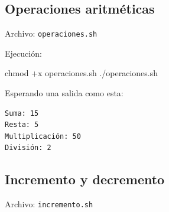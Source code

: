 \documentclass[
  spanish,
  12pt,
  letterpaper,
  DIV=11,
  numbers=noendperiod]{scrreprt}
\newenvironment{Shaded}{\begin{snugshade}}{\end{snugshade}}
\newcommand{\BuiltInTok}[1]{\textcolor[rgb]{0.00,0.23,0.31}{#1}}
\newcommand{\CommentTok}[1]{\textcolor[rgb]{0.37,0.37,0.37}{#1}}
\newcommand{\ExtensionTok}[1]{\textcolor[rgb]{0.00,0.23,0.31}{#1}}
\newcommand{\FunctionTok}[1]{\textcolor[rgb]{0.28,0.35,0.67}{#1}}
\newcommand{\NormalTok}[1]{\textcolor[rgb]{0.00,0.23,0.31}{#1}}
\newcommand{\OperatorTok}[1]{\textcolor[rgb]{0.37,0.37,0.37}{#1}}
\newcommand{\StringTok}[1]{\textcolor[rgb]{0.13,0.47,0.30}{#1}}
\newcommand{\VariableTok}[1]{\textcolor[rgb]{0.07,0.07,0.07}{#1}}
\begin{document}
\subsection{Operaciones aritméticas}\label{operaciones-aritmuxe9ticas}

Archivo: \texttt{operaciones.sh}

\begin{Shaded}
\end{Shaded}

Ejecución:

\begin{Shaded}
\begin{Highlighting}[]
\FunctionTok{chmod}\NormalTok{ +x operaciones.sh}
\ExtensionTok{./operaciones.sh}
\end{Highlighting}
\end{Shaded}

Esperando una salida como esta:

\begin{verbatim}
Suma: 15
Resta: 5
Multiplicación: 50
División: 2
\end{verbatim}

\subsection{Incremento y decremento}\label{incremento-y-decremento}

Archivo: \texttt{incremento.sh}
\end{document}
